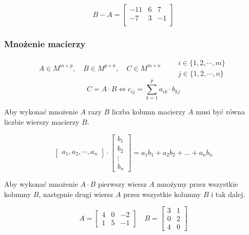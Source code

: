 \documentclass[../Matematyka.tex]{subfiles}
\begin{document}
    \begin{displaymath}
        B - A =
        \begin{bmatrix}
            -11 & 6 &  7 \\
            -7  & 3 & -1 \\
        \end{bmatrix}
    \end{displaymath}

    \subsubsection{Mnożenie macierzy}
    \begin{displaymath}
        A \in M^{m \times p},\quad
        B \in M^{p \times n},\quad
        C \in M^{m \times n}
        \qquad
        \substack
        {
            i \in \{1,2, \cdots,m\}\\
            j \in \{1,2, \cdots,n\}
        }
    \end{displaymath}
    \[C = A \cdot B \iff c_{ij} = \sum_{k=1}^p a_{ik} \cdot b_{kj}\]

    Aby wykonać mnożenie \(A\) razy \(B\) liczba kolumn macierzy \(A\) musi być równa liczbie wierszy macierzy \(B\).

    \begin{displaymath}
        \begin{bmatrix}
            a_1, a_2, \cdots\!, a_n 
        \end{bmatrix}
        \cdot
        \begin{bmatrix}
            b_1\\ 
            b_2\\
            \vdots\\
             b_n 
        \end{bmatrix} =
        a_1b_1 + a_2b_2 + \dots + a_nb_n
    \end{displaymath}

    Aby wykonać mnożenie \(A \cdot B\) pierwszy wiersz \(A\) mnożymy przez wszystkie kolumny \(B\), następnie drugi wiersz \(A\) przez wszystkie kolumny \(B\) i tak dalej.

    \begin{displaymath}
        A =
        \begin{bmatrix}
            4 & 0 & -2 \\
            1 & 5 & -1
        \end{bmatrix}\quad
        B =
        \begin{bmatrix}
            3 & 1 \\
            0 & 2 \\
            4 & 0
        \end{bmatrix}
    \end{displaymath}
\end{document}
